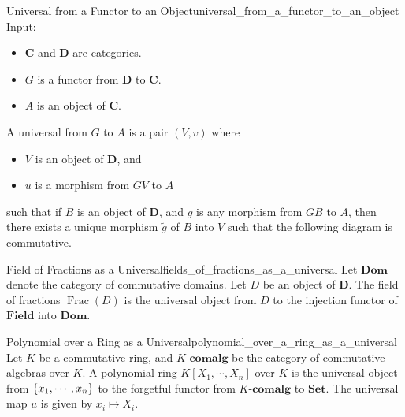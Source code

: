 \documentclass{article}
\begin{document}
\begin{definition}{Universal from a Functor to an Object}{universal_from_a_functor_to_an_object}
    Input:
    \begin{itemize}
        \item $\mathbf{C}$ and $\mathbf{D}$ are categories.
        \item $G$ is a functor from $\mathbf{D}$ to $\mathbf{C}$.
        \item $A$ is an object of $\mathbf{C}$.
    \end{itemize}
    A universal from $G$ to $A$ is a pair $(V,v)$ where
    \begin{itemize}
        \item $V$ is an object of $\mathbf{D}$, and
        \item $u$ is a morphism from $GV$ to $A$
    \end{itemize}
    such that if $B$ is an object of $\mathbf{D}$,
    and $g$ is any morphism from $GB$ to $A$,
    then there exists a unique morphism $\tilde{g}$ of $B$ into $V$
    such that the following diagram is commutative.
    \begin{center}
    \end{center}
\end{definition}

\begin{example}{Field of Fractions as a Universal}{fields_of_fractions_as_a_universal}
    Let $\mathbf{Dom}$ denote the category of commutative domains.
    Let $D$ be an object of $\mathbf{D}$.
    The field of fractions $\operatorname{Frac}(D)$ is the universal object from $D$ to the injection functor of $\mathbf{Field}$ into $\mathbf{Dom}$.
\end{example}

\begin{example}{Polynomial over a Ring as a Universal}{polynomial_over_a_ring_as_a_universal}
    Let $K$ be a commutative ring, and $K$-$\mathbf{comalg}$ be the category of commutative algebras over $K$.
    A polynomial ring $K[X_1,\cdots,X_n]$ over $K$ is the universal object from $\qty{x_1,\cdots,x_n}$ to the forgetful functor from $K$-$\mathbf{comalg}$ to $\mathbf{Set}$.
    The universal map $u$ is given by $x_i \mapsto X_i$.
\end{example}
\end{document}
